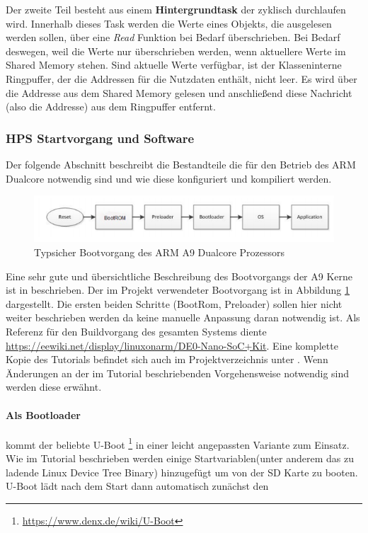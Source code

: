 Der zweite Teil besteht aus einem \textbf{Hintergrundtask} der zyklisch durchlaufen wird. Innerhalb dieses Task werden die Werte eines Objekts, die ausgelesen werden sollen, über eine \textit{Read} Funktion bei Bedarf überschrieben. Bei Bedarf deswegen, weil die Werte nur überschrieben werden, wenn aktuellere Werte im Shared Memory stehen. Sind aktuelle Werte verfügbar, ist der Klasseninterne Ringpuffer, der die Addressen für die Nutzdaten enthält, nicht leer. Es wird über die Addresse aus dem Shared Memory gelesen und anschließend diese Nachricht (also die Addresse) aus dem Ringpuffer entfernt.

\subsubsection{\ac{HPS} Startvorgang und Software}
Der folgende Abschnitt beschreibt die Bestandteile die für den Betrieb des ARM Dualcore notwendig sind und wie diese konfiguriert und kompiliert werden.\\

\begin{figure}
	\includegraphics[width=\textwidth]{Abb/Booting.png}
	\caption{Typsicher Bootvorgang des ARM A9 Dualcore Prozessors \cite{arm_booting}}
	\label{Software:ArmBooting}
\end{figure}

Eine sehr gute und übersichtliche Beschreibung des Bootvorgangs der A9 Kerne ist in \cite{arm_booting} beschrieben. Der im \Projectname Projekt verwendeter Bootvorgang ist in Abbildung \ref{Software:ArmBooting} dargestellt. Die ersten beiden Schritte (BootRom, Preloader) sollen hier nicht weiter beschrieben werden da keine manuelle Anpassung daran notwendig ist. Als Referenz für den Buildvorgang des gesamten Systems diente \href{https://eewiki.net/display/linuxonarm/DE0-Nano-SoC+Kit}{https://eewiki.net/display/linuxonarm/DE0-Nano-SoC+Kit}. Eine komplette Kopie des Tutorials befindet sich auch im Projektverzeichnis unter . Wenn Änderungen an der im Tutorial beschriebenden Vorgehensweise notwendig sind werden diese erwähnt.

\paragraph{Als Bootloader} kommt der beliebte U-Boot \footnote{\href{https://www.denx.de/wiki/U-Boot}{https://www.denx.de/wiki/U-Boot}} in einer leicht angepassten Variante zum Einsatz. Wie im Tutorial beschrieben werden einige Startvariablen(unter anderem das zu ladende Linux Device Tree Binary) hinzugefügt um von der SD Karte zu booten. U-Boot lädt nach dem Start dann automatisch zunächst den

